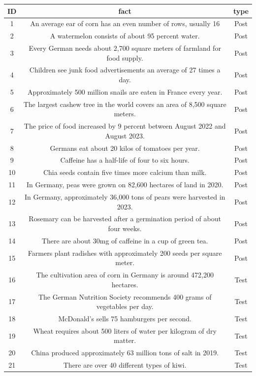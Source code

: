 \documentclass[
  letterpaper,
  DIV=11,
  numbers=noendperiod]{scrartcl}
\begin{document}
\begin{tabular}[t]{c|c|c}
\hline
ID & fact & type\\
\hline
1 & An average ear of corn has an even number of rows, usually 16 & Post\\
\hline
2 & A watermelon consists of about 95 percent water. & Post\\
\hline
3 & Every German needs about 2,700 square meters of farmland for food supply. & Post\\
\hline
4 & Children see junk food advertisements an average of 27 times a day. & Post\\
\hline
5 & Approximately 500 million snails are eaten in France every year. & Post\\
\hline
6 & The largest cashew tree in the world covers an area of 8,500 square meters. & Post\\
\hline
7 & The price of food increased by 9 percent between August 2022 and August 2023. & Post\\
\hline
8 & Germans eat about 20 kilos of tomatoes per year. & Post\\
\hline
9 & Caffeine has a half-life of four to six hours. & Post\\
\hline
10 & Chia seeds contain five times more calcium than milk. & Post\\
\hline
11 & In Germany, peas were grown on 82,600 hectares of land in 2020. & Post\\
\hline
12 & In Germany, approximately 36,000 tons of pears were harvested in 2023. & Post\\
\hline
13 & Rosemary can be harvested after a germination period of about four weeks. & Post\\
\hline
14 & There are about 30mg of caffeine in a cup of green tea. & Post\\
\hline
15 & Farmers plant radishes with approximately 200 seeds per square meter. & Post\\
\hline
16 & The cultivation area of corn in Germany is around 472,200 hectares. & Test\\
\hline
17 & The German Nutrition Society recommends 400 grams of vegetables per day. & Test\\
\hline
18 & McDonald's sells 75 hamburgers per second. & Test\\
\hline
19 & Wheat requires about 500 liters of water per kilogram of dry matter. & Test\\
\hline
20 & China produced approximately 63 million tons of salt in 2019. & Test\\
\hline
21 & There are over 40 different types of kiwi. & Test\\
\hline
\end{tabular}
\end{document}
